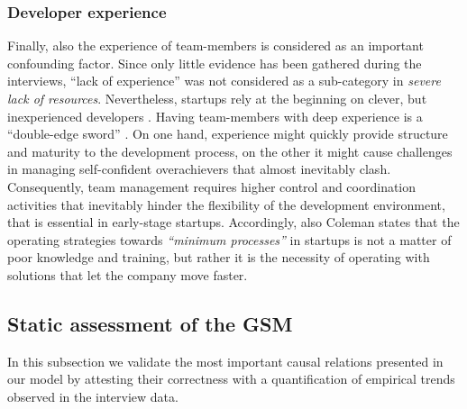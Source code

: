 \documentclass[10pt,journal,letterpaper,compsoc]{IEEEtran}
\begin{document}
\subsubsection{Developer experience} 
Finally, also the experience of team-members is considered as an important 
confounding factor. Since only little evidence has been gathered during the 
interviews, ``lack of experience'' was not considered as a sub-category in 
\textit{severe lack of resources}. Nevertheless, startups rely at the beginning 
on clever, but inexperienced developers \cite{Crowne2002}. Having team-members 
with deep experience is a ``double-edge sword'' \cite{Yoffie1999}. On one hand, 
experience might quickly provide structure and maturity to the development 
process, on the other it might cause challenges in managing self-confident 
overachievers that almost inevitably clash. Consequently, team management 
requires higher control and coordination activities that inevitably hinder the 
flexibility of the development environment, that is essential in early-stage 
startups. Accordingly, also Coleman \cite{Coleman2007,
Coleman2008a,Coleman2008} states that the operating strategies towards 
\textit{``minimum processes''} in startups is not a matter of poor knowledge and 
training, but rather it is the necessity of operating with solutions that let 
the company move faster.


\subsection{Static assessment of the GSM}
\label{sect:theory:validation:stats}

In this subsection we validate the most important causal relations presented in 
our model by attesting their correctness  with a quantification of empirical 
trends observed in the interview data. 
\end{document}
